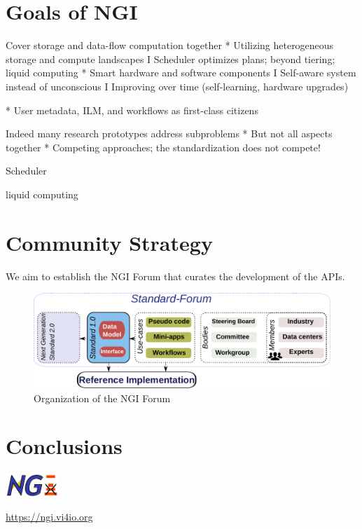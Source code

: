 \documentclass[a4paper, twocolumn]{article}
\begin{document}
\section{Goals of NGI}

Cover storage and data-flow computation together
* Utilizing heterogeneous storage and compute landscapes
I Scheduler optimizes plans; beyond tiering; liquid computing
* Smart hardware and software components
I Self-aware system instead of unconscious
I Improving over time (self-learning, hardware upgrades)

* User metadata, ILM, and workflows as first-class citizens

Indeed many research prototypes address subproblems
* But not all aspects together
* Competing approaches; the standardization does not compete!


Scheduler

liquid computing



\section{Community Strategy}

We aim to establish the NGI Forum that curates the development of the APIs.

\begin{figure}[b]
  \includegraphics[width=\columnwidth]{standardization}
  \caption{Organization of the NGI Forum}
  \label{fig:standardization}
\end{figure}

\section{Conclusions}

\includegraphics[width=2cm]{ngi-logo}

\noindent\url{https://ngi.vi4io.org}
\end{document}
